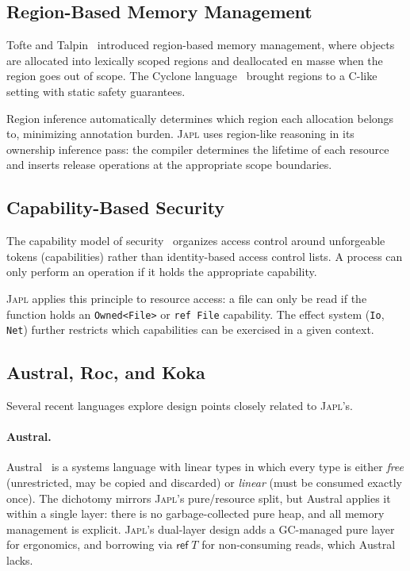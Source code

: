 \documentclass[11pt]{article}
\newcommand{\JAPL}{\textsc{Japl}}
\newcommand{\rref}{\mathsf{ref}}
\begin{document}
\subsection{Region-Based Memory Management}\label{sec:bg-regions}

Tofte and Talpin~\cite{tofte1997region} introduced region-based memory
management, where objects are allocated into lexically scoped regions
and deallocated en masse when the region goes out of scope.  The
Cyclone language~\cite{jim2002cyclone,grossman2002region} brought
regions to a C-like setting with static safety guarantees.

Region inference automatically determines which region each allocation
belongs to, minimizing annotation burden.  \JAPL{} uses region-like
reasoning in its ownership inference pass: the compiler determines the
lifetime of each resource and inserts release operations at the
appropriate scope boundaries.

\subsection{Capability-Based Security}\label{sec:bg-capabilities}

The capability model of security~\cite{dennis1966programming,
miller2006robust} organizes access control around unforgeable tokens
(capabilities) rather than identity-based access control lists.  A
process can only perform an operation if it holds the appropriate
capability.

\JAPL{} applies this principle to resource access: a file can only be
read if the function holds an \texttt{Owned<File>} or \texttt{ref File}
capability.  The effect system (\texttt{Io}, \texttt{Net}) further
restricts which capabilities can be exercised in a given context.

\subsection{Austral, Roc, and Koka}\label{sec:bg-austral-roc-koka}

Several recent languages explore design points closely related to
\JAPL{}'s.

\paragraph{Austral.}
Austral~\cite{austral2023} is a systems language with linear types in
which every type is either \emph{free} (unrestricted, may be copied
and discarded) or \emph{linear} (must be consumed exactly once).  The
dichotomy mirrors \JAPL{}'s pure/resource split, but Austral applies
it within a single layer: there is no garbage-collected pure heap, and
all memory management is explicit.  \JAPL{}'s dual-layer design adds a
GC-managed pure layer for ergonomics, and borrowing via $\rref\;T$ for
non-consuming reads, which Austral lacks.
\end{document}
